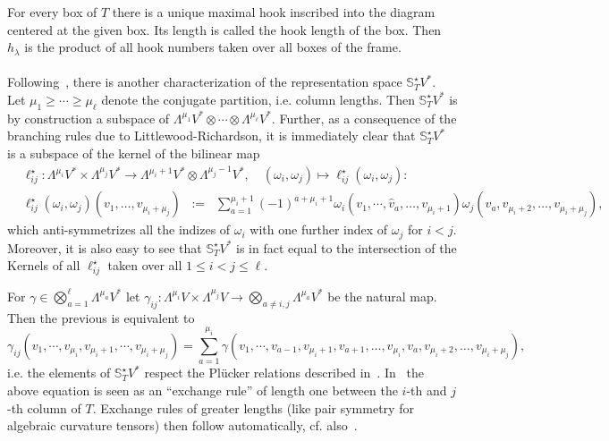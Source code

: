 \documentclass[11pt,a4paper]{article}
\theoremstyle{plain}
\theoremstyle{remark}
\newcommand{\bbS}{\mathbb{S}}
\begin{document}
For every box of $T$ there is a unique maximal hook inscribed into the 
diagram centered at the given box. Its length is called the hook length of the
box. Then  $h_\lambda$ is the product of all hook numbers taken over all boxes of the frame. 



\paragraph{}
Following~\cite[Ch.~15.5]{FH}, there is another characterization of the representation space $\bbS^\star_TV^*$. Let $\mu_1\geq \cdots \geq \mu_\ell$ denote the conjugate
partition, i.e. column lengths. Then $\bbS^\star_TV^*$ is by construction a subspace of $\Lambda^{\mu_1}V^*\otimes\cdots \otimes \Lambda^{\mu_\ell}V^*$. Further, as a consequence of the branching rules due
to Littlewood-Richardson, it is immediately clear that $\bbS^\star_TV^*$ is a subspace of the kernel of the bilinear map
\begin{align}
&\ell_{ij}^\star \colon \Lambda^{\mu_i}V^*\times \Lambda^{\mu_j}V^*\to
\Lambda^{\mu_i+1}V^*\otimes \Lambda^{\mu_j-1}V^*,\quad (\omega_i,\omega_j)
\mapsto \ell_{ij}^\star(\omega_i,\omega_j):\\ 
& \ell_{ij}^\star(\omega_i,\omega_j)(v_1,\ldots,v_{\mu_i+\mu_j})\;\;:=\;\; \sum_{a=1}^{\mu_i+1}(-1)^{a+\mu_i+1}\omega_i(v_1,\cdots,\hat v_a,\ldots,v_{\mu_i+1})\omega_j(v_a,v_{\mu_i+2},\ldots,v_{\mu_i+\mu_j}),
\end{align}
which anti-symmetrizes all the indizes of $\omega_i$ with one further
index of $\omega_j$ for $i<j$. Moreover, it is also easy to see that $\bbS^\star_TV^*$ is in fact equal to the intersection of the
Kernels of all $\ell_{ij}^\star$ taken over all $1\leq i < j \leq \ell$.

For $\gamma\in \bigotimes_{a=1}^\ell \Lambda^{\mu_a}V^*$ let
$\gamma_{ij} \colon \Lambda^{\mu_i}V\times \Lambda^{\mu_j}V \to \bigotimes_{a\neq i,j} \Lambda^{\mu_a}V^*$ be the natural map. Then the previous is equivalent to
\begin{equation}\label{eq:exchange_rule_column}
\gamma_{ij}(v_1,\cdots,v_{\mu_i},v_{\mu_i+1},\cdots,v_{\mu_i+\mu_j}) = \sum_{a=1}^{\mu_i}\gamma(v_1,\cdots,v_{a-1},v_{\mu_i+1},v_{a+1},\ldots,v_{\mu_i},v_a,v_{\mu_i+2},\ldots,v_{\mu_i+\mu_j}),
\end{equation}
i.e. the elements of $\bbS^\star_TV^*$ respect the Plücker relations described in~\cite[15.53]{FH}. In~\cite[Ch.~8]{F} the above equation is seen 
as an ``exchange rule'' of length one between the  $i$-th and $j$-th column of $T$. Exchange rules of greater lengths (like pair symmetry for algebraic curvature tensors) then follow
automatically, cf. also~\cite[Exercise 15.54]{FH}.
\end{document}
